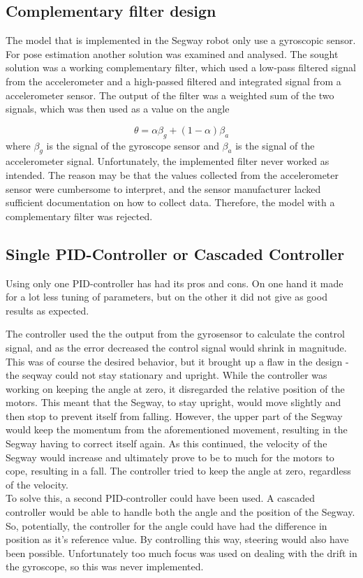 \subsection{Complementary filter design}
The model that is implemented in the Segway robot only use a gyroscopic sensor. For pose estimation another solution was examined and analysed. The sought solution was a working complementary filter, which used a low-pass filtered signal from the accelerometer and a high-passed filtered and integrated signal from a accelerometer sensor. The output of the filter was a weighted sum of the two signals, which was then used as a value on the angle 
 
\begin{displaymath}
\theta = \alpha \beta_{g} + (1-\alpha)\beta_{a}
\end{displaymath}
where $\beta_g$ is the signal of the gyroscope sensor and $\beta_a$ is the signal of the accelerometer signal. Unfortunately, the implemented filter never worked as intended. The reason may be that the values collected from the accelerometer sensor were cumbersome to interpret, and the sensor manufacturer lacked sufficient documentation on how to collect data. Therefore, the model with a complementary filter was rejected.

\subsection{Single PID-Controller or Cascaded Controller}
Using only one PID-controller has had its pros and cons. On one hand it made for a lot less tuning of parameters, but on the other it did not give as good results as expected.

The controller used the the output from the gyrosensor to calculate the control signal, and as the error decreased the control signal would shrink in magnitude. This was of course the desired behavior, but it brought up a flaw in the design - the seqway could not stay stationary and upright. While the controller was working on keeping the angle at zero, it disregarded the relative position of the motors. This meant that the Segway, to stay upright, would move slightly and then stop to prevent itself from falling. However, the upper part of the Segway would keep the momentum from the aforementioned movement, resulting in the Segway having to correct itself again. As this continued, the velocity of the Segway would increase and ultimately prove to be to much for the motors to cope, resulting in a fall. The controller tried to keep the angle at zero, regardless of the velocity.
\\[3ex]
To solve this, a second PID-controller could have been used. A cascaded controller would be able to handle both the angle and the position of the Segway. So, potentially, the controller for the angle could have had the difference in position as it's reference value. By controlling this way, steering would also have been possible. Unfortunately too much focus was used on dealing with the drift in the gyroscope, so this was never implemented.


